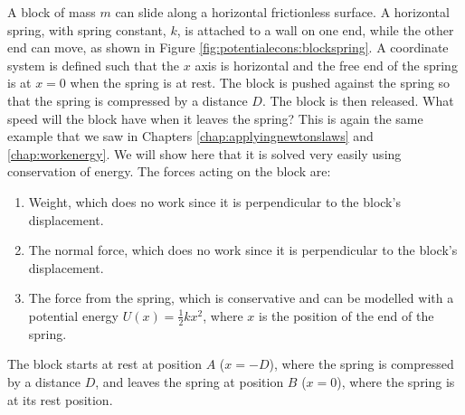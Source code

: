 \begin{example}{\label{ex:potentialecons:blockspring}
A block of mass $m$ can slide along a horizontal frictionless surface. A horizontal spring, with spring constant, $k$, is attached to a wall on one end, while the other end can move, as shown in Figure \ref{fig:potentialecons:blockspring}. A coordinate system is defined such that the $x$ axis is horizontal and the free end of the spring is at $x=0$ when the spring is at rest. The block is pushed against the spring so that the spring is compressed by a distance $D$. The block is then released. What speed will the block have when it leaves the spring?}
This is again the same example that we saw in Chapters \ref{chap:applyingnewtonslaws} and \ref{chap:workenergy}. We will show here that it is solved very easily using conservation of energy. The forces acting on the block are:
\begin{enumerate}
\item Weight, which does no work since it is perpendicular to the block's displacement.
\item The normal force, which does no work since it is perpendicular to the block's displacement.
\item The force from the spring, which is conservative and can be modelled with a potential energy $U(x)=\frac{1}{2}kx^2$, where $x$ is the position of the end of the spring.
\end{enumerate}

The block starts at rest at position $A$ ($x=-D$), where the spring is compressed by a distance $D$, and leaves the spring at position $B$ ($x=0$), where the spring is at its rest position. 


\end{example}
